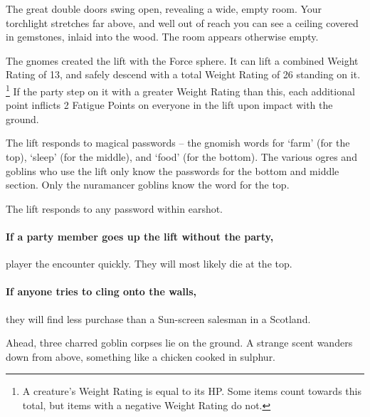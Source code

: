 \begin{multicols}{2}




\begin{boxtext}

	The great double doors swing open, revealing a wide, empty room.
	Your torchlight stretches far above, and well out of reach you can see a ceiling covered in gemstones, inlaid into the wood.
	The room appears otherwise empty.

\end{boxtext}

The gnomes created the lift with the Force sphere.
It can lift a combined Weight Rating of 13, and safely descend with a total Weight Rating of 26 standing on it.%
\footnote{A creature's Weight Rating is equal to its HP.
Some items count towards this total, but items with a negative Weight Rating do not.}
If the party step on it with a greater Weight Rating than this, each additional point inflicts 2 Fatigue Points on everyone in the lift upon impact with the ground.

The lift responds to magical passwords -- the gnomish words for `farm' (for the top), `sleep' (for the middle), and `food' (for the bottom).
The various ogres and goblins who use the lift only know the passwords for the bottom and middle section.
Only the nuramancer goblins know the word for the top.

The lift responds to any password within earshot.

\paragraph{If a party member goes up the lift without the party,}
player the encounter quickly.
They will most likely die at the top.

\paragraph{If anyone tries to cling onto the walls,}
they will find less purchase than a Sun-screen salesman in a Scotland.


\begin{boxtext}

	Ahead, three charred goblin corpses lie on the ground.
	A strange scent wanders down from above, something like a chicken cooked in sulphur.


\end{boxtext}
\end{multicols}
